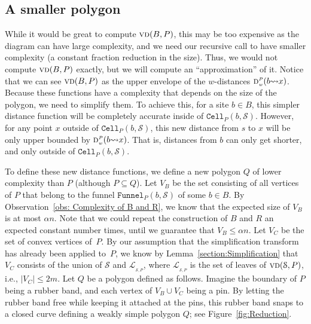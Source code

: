 \documentclass[a4paper,UKenglish]{socg-lipics-v2018}
\newcommand{\s}{\mathcal S}
\newcommand{\dd}[3][P]{\ensuremath{\textsc{d}_{\scriptscriptstyle w}^{\scriptscriptstyle #1}(#2 {\leadsto} #3)}}
\newcommand{\funnel}[2][P]{\ensuremath{\mathtt{Funnel}_{\scriptscriptstyle #1}(#2)}}
\newcommand{\cell}[2][P]{\ensuremath{\mathtt{Cell}_{\scriptscriptstyle #1}(#2)}}
\newcommand{\vd}[2][P]{\textsc{vd}(#2, #1)}
\newcommand{\LL}[1][\s, P]{\ensuremath{\mathcal L_{_{#1}}}}
\begin{document}
\subsection{A smaller polygon}\label{section:Smaller Polygon}
While it would be great to compute $\vd{B}$, this may be too expensive as the diagram can have large complexity, and we need our recursive call to have smaller complexity (a constant fraction reduction in the size). 
Thus, we would not compute $\vd{B}$ exactly, but we will compute an ``approximation'' of it. 
Notice that we can see $\vd{B}$ as the upper envelope of the $w$-distances $\dd{b}{x}$. 
Because these functions have a complexity that depends on the size of the polygon, we need to simplify them.
To achieve this, for a site $b\in B$, this simpler distance function will be completely accurate inside of $\cell{b, \s}$. 
However, for any point $x$ outside of $\cell{b, \s}$, this new distance from $s$ to $x$ will be only upper bounded by $\dd{b}{x}$. 
That is, distances from $b$ can only get shorter, and only outside of $\cell{b, \s}$. 

To define these new distance functions, we define a new polygon $Q$ of lower complexity than $P$ (although $P\subseteq Q$).
Let $V_B$ be the set consisting of all vertices of $P$ that belong to the funnel $\funnel{b, \s}$ of some $b\in B$.
By Observation~\ref{obs: Complexity of B and R}, we know that the expected size of $V_B$ is at most $\alpha n$. 
Note that we could repeat the construction of $B$ and $R$ an expected constant number times, until we guarantee that $V_B\leq \alpha n$.
Let $V_C$ be the set of convex vertices of~$P$. By our assumption that the simplification transform has already been applied to~$P$, 
we know by Lemma~\ref{section:Simplification} that $V_C$ consists of the union of $\s$ and $\LL$, where $\LL$ is the set of leaves of $\vd{\s}$, i.e., $|V_C| \leq 2m$.
Let $Q$ be a polygon defined as follows. 
Imagine the boundary of $P$ being a rubber band, and each vertex of $V_B\cup V_C$ being a pin.
By letting the rubber band free while keeping it attached at the pins, this rubber band snaps to a closed curve defining a weakly simple polygon $Q$; see Figure~\ref{fig:Reduction}.
\end{document}

